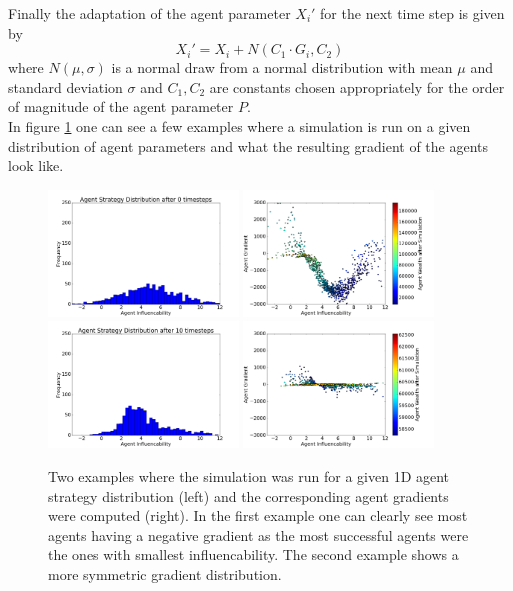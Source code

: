 \documentclass[11pt]{article}
\begin{document}
Finally the adaptation of the agent parameter $X_i'$ for the next time step is given by
\begin{equation}
  X_i' = X_i + N(C_1\cdot G_i, C_2)
\end{equation}
where $N(\mu, \sigma)$ is a normal draw from a normal distribution with mean $\mu$ and standard deviation $\sigma$ and $C_1,C_2$ are constants chosen appropriately for the order of magnitude of the agent parameter $P$. \\
In figure \ref{fig:heuristicgradient} one can see a few examples where a simulation is run on a given distribution of agent parameters and what the resulting gradient of the agents look like.
\begin{figure}
  \centering
  \quad
  \includegraphics[width=0.45\textwidth]{figures/heuristic_gradient_example_1.png}
  \includegraphics[width=0.45\textwidth]{figures/heuristic_gradient_example_2.png}
  \includegraphics[width=0.45\textwidth]{figures/heuristic_gradient_example_3.png}
  \includegraphics[width=0.45\textwidth]{figures/heuristic_gradient_example_4.png}
  \caption[Examples Heuristic Gradient]{Two examples where the simulation was run for a given 1D agent strategy distribution (left) and the corresponding agent gradients were computed (right). In the first example one can clearly see most agents having a negative gradient as the most successful agents were the ones with smallest influencability. The second example shows a more symmetric gradient distribution.}
  \label{fig:heuristicgradient}
\end{figure}
\end{document}
